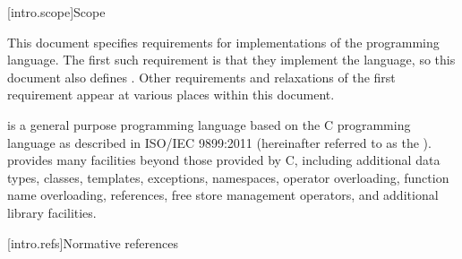 
[intro.scope]{Scope}

\pnum
{}%
This document specifies requirements for implementations
of the \Cpp{} programming language. The first such requirement is that
they implement the language, so this document also
defines \Cpp{}. Other requirements and relaxations of the first
requirement appear at various places within this document.

\pnum
\Cpp{} is a general purpose programming language based on the C
programming language as described in ISO/IEC 9899:2011
 (hereinafter referred to as the
). \Cpp{} provides many facilities
beyond those provided by C, including additional data types,
classes, templates, exceptions, namespaces, operator
overloading, function name overloading, references, free store
management operators, and additional library facilities.%

%
[intro.refs]{Normative references}

